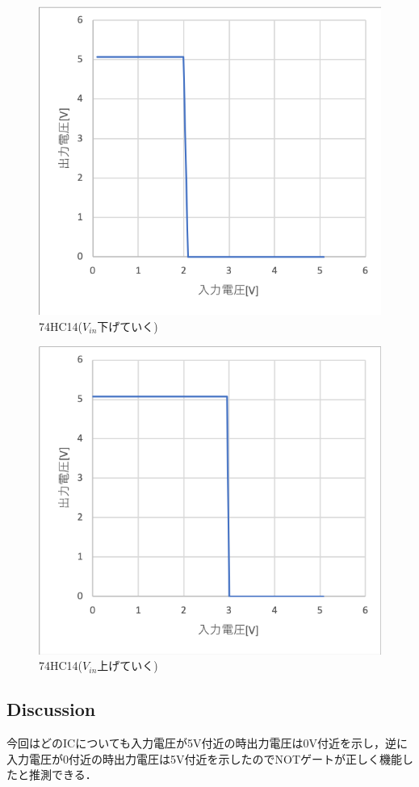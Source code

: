 \documentclass[11pt, a4paper,twocolumn]{jarticle}
\begin{document}
\begin{figure}[htbp]
 \begin{center}
  \includegraphics[width=0.7\linewidth]{fig3.png}
 \end{center}
 \caption{74HC14($V_{in}$下げていく)}
 \label{fig:3}
\end{figure}

\begin{figure}[htbp]
 \begin{center}
  \includegraphics[width=0.7\linewidth]{fig4.png}
 \end{center}
 \caption{74HC14($V_{in}$上げていく)}
 \label{fig:4}
\end{figure}

\subsection{Discussion}
今回はどのICについても入力電圧が5V付近の時出力電圧は0V付近を示し，逆に入力電圧が0付近の時出力電圧は5V付近を示したのでNOTゲートが正しく機能したと推測できる．
\end{document}
